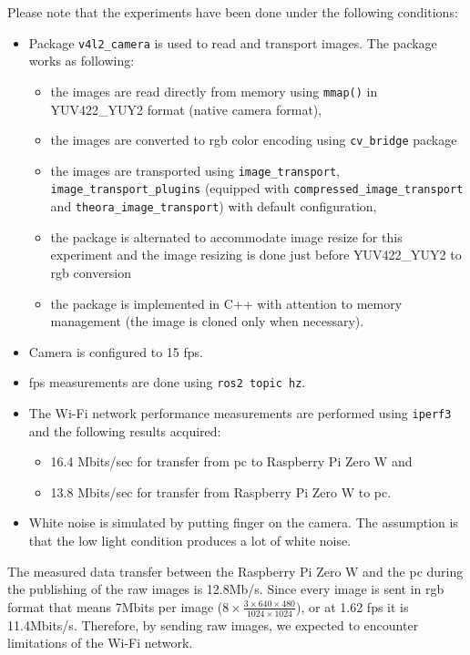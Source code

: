 Please note that the experiments have been done under the following conditions:
\begin{itemize}
    \item Package \texttt{v4l2\_camera} is used to read and transport images. The package works as following:
        \begin{itemize}
            \item the images are read directly from memory using \texttt{mmap()} in YUV422\_YUY2 format (native camera format),
            \item the images are converted to \ac{rgb} color encoding using \texttt{cv\_bridge} package
            \item the images are transported using \texttt{image\_transport}, \texttt{image\_transport\_plugins} (equipped with \texttt{compressed\_image\_transport} and \texttt{theora\_image\_transport}) with default configuration,
            \item the package is alternated to accommodate image resize for this experiment and the image resizing is done just before YUV422\_YUY2 to \ac{rgb} conversion
            \item the package is implemented in C++ with attention to memory management (the image is cloned only when necessary).
        \end{itemize}
    \item Camera is configured to 15 \ac{fps}.
    \item \ac{fps} measurements are done using \texttt{ros2 topic hz}.
    \item The Wi-Fi network performance measurements are performed using \texttt{iperf3} and the following results acquired:
        \begin{itemize}
            \item 16.4 Mbits/sec for transfer from \ac{pc} to Raspberry Pi Zero W and
            \item 13.8 Mbits/sec for transfer from Raspberry Pi Zero W to \ac{pc}.
        \end{itemize}
    \item White noise is simulated by putting finger on the camera.
    The assumption is that the low light condition produces a lot of white noise. 
\end{itemize}

The measured data transfer between the Raspberry Pi Zero W and the \ac{pc} during the publishing of the raw images is 12.8Mb/s.
Since every image is sent in \ac{rgb} format that means 7Mbits per image ($ 8 \times \frac{ 3 \times 640 \times 480 }{1024 \times 1024}$), or at 1.62 \ac{fps} it is 11.4Mbits/s.
Therefore, by sending raw images, we expected to encounter limitations of the Wi-Fi network.

